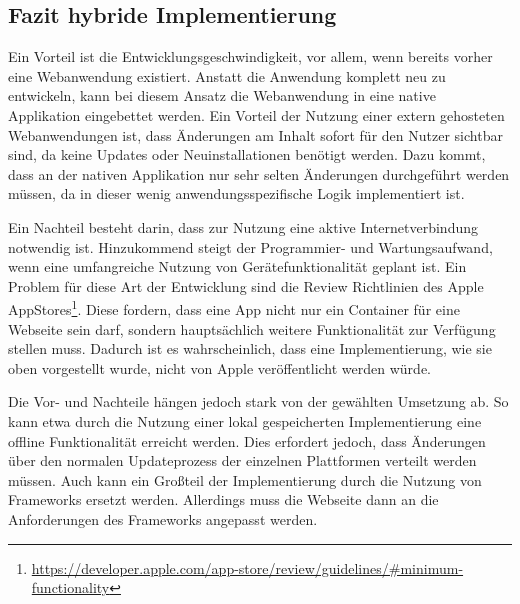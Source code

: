 \subsection{Fazit hybride Implementierung}
Ein Vorteil ist die Entwicklungsgeschwindigkeit, vor allem, wenn bereits vorher eine Webanwendung existiert. Anstatt die Anwendung komplett neu zu entwickeln, kann bei diesem Ansatz die Webanwendung in eine native Applikation eingebettet werden.
Ein Vorteil der Nutzung einer extern gehosteten Webanwendungen ist, dass Änderungen am Inhalt sofort für den Nutzer sichtbar sind, da keine Updates oder Neuinstallationen benötigt werden. 
Dazu kommt, dass an der nativen Applikation nur sehr selten Änderungen durchgeführt werden müssen, da in dieser wenig anwendungsspezifische Logik implementiert ist.

Ein Nachteil besteht darin, dass zur Nutzung eine aktive Internetverbindung notwendig ist. Hinzukommend steigt der Programmier- und Wartungsaufwand, wenn eine umfangreiche Nutzung von Gerätefunktionalität geplant ist. 
Ein Problem für diese Art der Entwicklung sind die Review Richtlinien des Apple AppStores\footnote{\url{https://developer.apple.com/app-store/review/guidelines/\#minimum-functionality}}. 
Diese fordern, dass eine App nicht nur ein Container für eine Webseite sein darf, sondern hauptsächlich weitere Funktionalität zur Verfügung stellen muss. Dadurch ist es wahrscheinlich, dass eine Implementierung, wie sie oben vorgestellt wurde, nicht von Apple veröffentlicht werden würde.

Die Vor- und Nachteile hängen jedoch stark von der gewählten Umsetzung ab. So kann etwa durch die Nutzung einer lokal gespeicherten Implementierung eine offline Funktionalität erreicht werden. Dies erfordert jedoch, dass Änderungen über den normalen Updateprozess der einzelnen Plattformen verteilt werden müssen.
Auch kann ein Großteil der Implementierung durch die Nutzung von Frameworks ersetzt werden. Allerdings muss die Webseite dann an die Anforderungen des Frameworks angepasst werden. 
